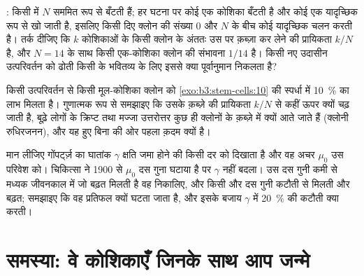 \begin{exercise}[$\star\star\star$]\label{exo:b3:stem-cells:10}
: किसी  में $N$  सममित रूप से बँटती हैं; हर
घटना पर कोई एक कोशिका बँटती है और कोई एक यादृच्छिक रूप से खो जाती है,
इसलिए किसी दिए क्लोन की संख्या $0$ और $N$ के बीच कोई यादृच्छिक चलन करती
है। तर्क दीजिए कि $k$ कोशिकाओं के किसी क्लोन के अंततः उस  पर क़ब्ज़ा
कर लेने की प्रायिकता $k/N$ है, और $N = 14$ के साथ किसी एक-कोशिका क्लोन
की संभावना $1/14$ है। किसी नए उदासीन उत्परिवर्तन को ढोती किसी 
के भवितव्य के लिए इससे क्या पूर्वानुमान निकलता है?
\end{exercise}

\begin{exercise}[$\star\star\star$]\label{exo:b3:stem-cells:11}
किसी उत्परिवर्तन से किसी मूल-कोशिका क्लोन को \cref{exo:b3:stem-cells:10}
की स्पर्धा में \qty{10}{\%} का लाभ मिलता है। गुणात्मक रूप से समझाइए कि
उसके क़ब्ज़े की प्रायिकता $k/N$ से कहीं ऊपर क्यों चढ़ जाती है, बूढ़े
लोगों के क्रिप्ट तथा मज्जा उत्तरोत्तर कुछ ही क्लोनों के क़ब्ज़े में
क्यों आते जाते हैं (क्लोनी रुधिरजनन), और यह  हुए बिना  की ओर
पहला क़दम क्यों है।
\end{exercise}

\begin{exercise}[$\star\star\star$]\label{exo:b3:stem-cells:12}
मान लीजिए गोंपर्ट्ज़ का घातांक $\gamma$ क्षति जमा होने की किसी दर को
दिखाता है और वह अचर $\mu_{0}$ उस परिवेश को। चिकित्सा ने 1900 से
$\mu_{0}$ दस गुना घटाया है पर $\gamma$ नहीं बदला। उस दस गुनी कमी से
मध्यक जीवनकाल में जो बढ़त मिलती है वह निकालिए, और किसी और दस गुनी कटौती
से मिलती और बढ़त; समझाइए कि वह प्रतिफल क्यों घटता जाता है, और इसके बजाय
$\gamma$ में \qty{20}{\%} की कटौती क्या करती।
\end{exercise}

\section{समस्या: वे कोशिकाएँ जिनके साथ आप जन्मे}

